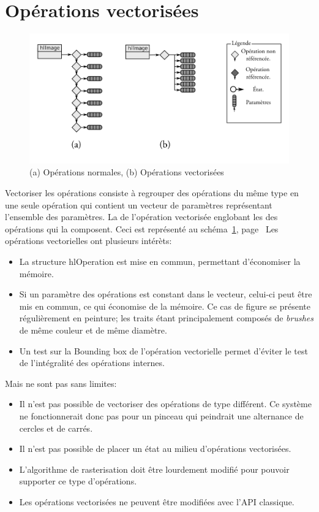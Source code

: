 	\section{Opérations vectorisées}
		\begin{figure}[ht]
			\centering
			\includegraphics[width=\textwidth]{images/vector} 
			\caption{(a) Opérations normales, (b) Opérations vectorisées}
			\label{fig:vector}
		\end{figure}
		Vectoriser les opérations consiste à regrouper des opérations du même type en une seule opération qui contient
		un vecteur de paramètres représentant l'ensemble des paramètres. La \BB de l'opération
		vectorisée englobant les \BB des opérations qui la composent. Ceci est représenté au 
		schéma~\ref{fig:vector}, page~\pageref{fig:vector}
		Les opérations vectorielles ont plusieurs intérèts:
		\begin{itemize}
			\item La structure hlOperation est mise en commun, permettant d'économiser la mémoire.
			\item Si un paramètre des opérations est constant dans le vecteur, celui-ci peut être mis en commun,
			ce qui économise de la mémoire. Ce cas de figure se présente régulièrement en peinture; les traits étant principalement
			composés de \emph{brushes} de même couleur et de même diamètre.
			\item Un test sur la Bounding box de l'opération vectorielle permet d'éviter le test de l'intégralité
			des opérations internes.
		\end{itemize}
		Mais ne sont pas sans limites:
		\begin{itemize}
			\item Il n'est pas possible de vectoriser des opérations de type différent. Ce système ne fonctionnerait
			donc pas pour un pinceau qui peindrait une alternance de cercles et de carrés.
			\item Il n'est pas possible de placer un état au milieu d'opérations vectorisées.
			\item L'algorithme de rasterisation doit être lourdement modifié pour pouvoir supporter ce type d'opérations.
			\item Les opérations vectorisées ne peuvent être modifiées avec l'API classique.
		\end{itemize}
